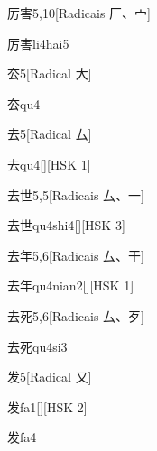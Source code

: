 \begin{entry}{厉害}{5,10}[Radicais ⼚、⼧]
  \begin{phonetics}{厉害}{li4hai5}
  \end{phonetics}
\end{entry}

\begin{entry}{厺}{5}[Radical ⼤]
  \begin{phonetics}{厺}{qu4}
  \end{phonetics}
\end{entry}

\begin{entry}{去}{5}[Radical ⼛]
  \begin{phonetics}{去}{qu4}[][HSK 1]
  \end{phonetics}
\end{entry}

\begin{entry}{去世}{5,5}[Radicais ⼛、⼀]
  \begin{phonetics}{去世}{qu4shi4}[][HSK 3]
  \end{phonetics}
\end{entry}

\begin{entry}{去年}{5,6}[Radicais ⼛、⼲]
  \begin{phonetics}{去年}{qu4nian2}[][HSK 1]
  \end{phonetics}
\end{entry}

\begin{entry}{去死}{5,6}[Radicais ⼛、⽍]
  \begin{phonetics}{去死}{qu4si3}
  \end{phonetics}
\end{entry}

\begin{entry}{发}{5}[Radical ⼜]
  \begin{phonetics}{发}{fa1}[][HSK 2]
  \end{phonetics}
  \begin{phonetics}{发}{fa4}
  \end{phonetics}
\end{entry}

